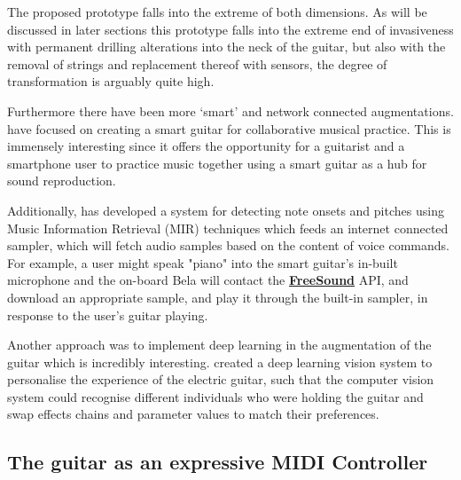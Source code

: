 The proposed prototype falls into the extreme of both dimensions. As will be discussed in later sections this prototype falls into the extreme end of invasiveness with permanent drilling alterations into the neck of the guitar, but also with the removal of strings and replacement thereof with sensors, the degree of transformation is arguably quite high. 

Furthermore there have been more `smart' and network connected augmentations. \cite{turchet_ubiquitous_2019} have focused on creating a smart guitar for collaborative musical practice. This is immensely interesting since it offers the opportunity for a guitarist and a smartphone user to
practice music together using a smart guitar as a hub for
sound reproduction. 

Additionally, \cite{khalil_crowdsourced_2019} has developed a system for detecting note onsets and pitches using Music Information Retrieval (MIR) techniques which feeds an internet connected sampler, which will fetch audio samples based on the content of voice commands. For example, a user might speak "piano" into the smart guitar's in-built microphone and the on-board Bela will contact the  \href{https://freesound.org/}{\textbf{FreeSound}} API, and download an appropriate sample, and play it through the built-in sampler, in response to the user's guitar playing. 

Another approach was to implement deep learning in the augmentation of the guitar which is incredibly interesting. \cite{john_personalisation_2020} created a deep learning vision system to personalise the experience of the electric guitar, such that the computer vision system could recognise different individuals who were holding the guitar and swap effects chains and parameter values to match their preferences. 

\subsection{The guitar as an expressive MIDI Controller}

